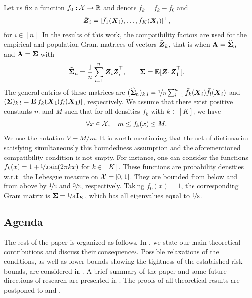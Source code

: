 Let us fix a function $f_0:\mathcal X\to{\mathbb R}$ and denote 
$\bar f_k = f_k-f_0$ and 
\begin{equation}
	\bar {\boldsymbol Z}_i = [\bar f_1(\boldsymbol X_i),\ldots,\bar f_K(\boldsymbol X_i)]^\top,
\end{equation}
for $i\in[n]$. In the results of this work, the compatibility factors are used for the empirical 
and population Gram matrices of vectors $\bar{\boldsymbol Z}_k$, that is when $\mathbf A = \widehat{\boldsymbol\Sigma}_n$ and 
$\mathbf A = \boldsymbol\Sigma$ with
\begin{equation}
\label{Gram}
\widehat{\boldsymbol\Sigma}_n = \frac1n \sum_{i=1}^n \bar{\boldsymbol Z}_i\bar{\boldsymbol Z}_i^\top,\qquad 
\boldsymbol\Sigma = \mathbf E[\bar{\boldsymbol Z}_1\bar{\boldsymbol Z}_1^\top].
\end{equation}
The general entries of these matrices are $(\widehat{\boldsymbol\Sigma}_n)_{k,l} =
\nicefrac1n\sum_{i=1}^n \bar f_k(\boldsymbol X_i)\bar f_l(\boldsymbol X_i)$ and $(\boldsymbol\Sigma)_{k,l} = 
\mathbf E[\bar f_k(\boldsymbol X_1)\bar f_l(\boldsymbol X_1)]$, respectively.
We assume that there exist positive constants $m$ and $M$ such that for all densities 
$f_k$ with $k \in [K]$, we have
\begin{equation}
\label{densConst}
\forall x \in \mathcal X, \quad m\le f_k(x) \le M.
\end{equation}
We use the notation $V = M/m$. It is worth mentioning that the set of dictionaries
satisfying simultaneously this boundedness assumption and the aforementioned compatibility 
condition is not empty. For instance, one can consider the functions 
$f_k(x) = 1+\nicefrac12\sin(2\pi k x)$ for $k\in [K]$. These functions are probability 
densities w.r.t.\ the Lebesgue measure on $\mathcal X = [0,1]$. They are bounded from below 
and from  above by $\nicefrac12$ and $\nicefrac32$, respectively. Taking $f_0(x) = 1$, 
the corresponding Gram matrix is $\boldsymbol\Sigma = \nicefrac18\,\mathbf I_K$, which has all eigenvalues
equal to $\nicefrac18$.

\subsection{Agenda}

The rest of the paper is organized as follows. In , we state our
main theoretical contributions and discuss their consequences. Possible relaxations of
the conditions, as well as lower bounds showing the tightness of the established risk
bounds, are considered in .
A brief summary of the paper and some future directions of research are presented
in . The proofs of all theoretical results are postponed
to  and .

